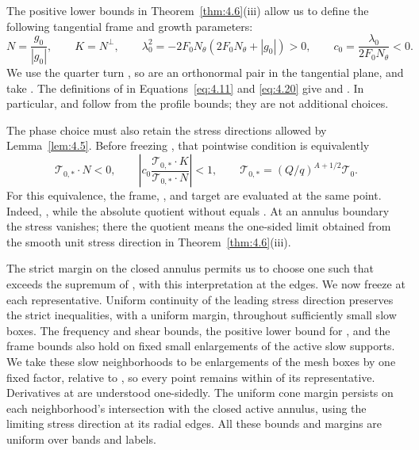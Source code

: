 The positive lower bounds in Theorem~\ref{thm:4.6}(iii) allow us to define the following tangential
frame and growth parameters:
\[
N=\frac{g_0}{|g_0|},\qquad K=N^\perp,\qquad
\lambda_0^2=-2F_0N_\theta(2F_0N_\theta+|g_0|)>0,\qquad
c_0=\frac{\lambda_0}{2F_0N_\theta}<0.
\]
We use the quarter turn , so  are an orthonormal pair in the tangential
plane, and take . The definitions of  in Equations~\eqref{eq:4.11} and \eqref{eq:4.20} give
 and . In particular,  and  follow from the
profile bounds; they are not additional choices.

The phase choice must also retain the stress directions allowed by Lemma~\ref{lem:4.5}. Before
freezing , that pointwise condition is equivalently
\begin{equation}
\mathcal T_{0,*}\cdot N<0,\qquad
\left|c_0\frac{\mathcal T_{0,*}\cdot K}{\mathcal T_{0,*}\cdot N}\right|<1,\qquad
\mathcal T_{0,*}=(Q/q)^{A+1/2}\mathcal T_0.
\tag{7.1}\label{eq:7.1}
\end{equation}
For this equivalence, the frame, , and target are evaluated at the same point. Indeed,
, while the absolute quotient without  equals . At an annulus
boundary the stress vanishes; there the quotient means the one-sided limit obtained from
the smooth unit stress direction in Theorem~\ref{thm:4.6}(iii).

The strict margin on the closed annulus permits us to choose one  such that
 exceeds the supremum of , with this interpretation at the
edges. We now freeze  at each representative. Uniform continuity of the leading stress
direction preserves the strict inequalities, with a uniform margin, throughout sufficiently
small slow boxes. The frequency and shear bounds, the positive lower bound for , and
the frame bounds also hold on fixed small enlargements of the active slow supports. We
take these slow neighborhoods to be enlargements of the mesh boxes by one fixed factor,
relative to , so every point remains within  of its representative. Derivatives at
 are understood one-sidedly. The uniform cone margin persists on each neighborhood's
intersection with the closed active annulus, using the limiting stress direction at its radial
edges. All these bounds and margins are uniform over bands and labels.

